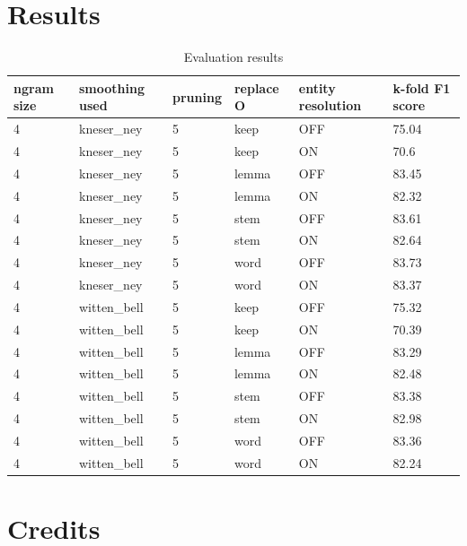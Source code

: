 \documentclass[11pt,a4paper]{article}
\begin{document}
\section{Results}
\begin{table}[]
\centering
\caption{Evaluation results }
\label{tab:eval-results}
\begin{tabular}{llllll}
\hline
\textbf{ngram size} & \textbf{smoothing used} & \textbf{pruning} & \textbf{replace O} & \textbf{entity resolution} & \textbf{k-fold F1 score} \\ \hline
4 & kneser\_ney & 5 & keep & OFF & 75.04 \\
4 & kneser\_ney & 5 & keep & ON & 70.6 \\
4 & kneser\_ney & 5 & lemma & OFF & 83.45 \\
4 & kneser\_ney & 5 & lemma & ON & 82.32 \\
4 & kneser\_ney & 5 & stem & OFF & 83.61 \\
4 & kneser\_ney & 5 & stem & ON & 82.64 \\
4 & kneser\_ney & 5 & word & OFF & 83.73 \\
4 & kneser\_ney & 5 & word & ON & 83.37 \\
4 & witten\_bell & 5 & keep & OFF & 75.32 \\
4 & witten\_bell & 5 & keep & ON & 70.39 \\
4 & witten\_bell & 5 & lemma & OFF & 83.29 \\
4 & witten\_bell & 5 & lemma & ON & 82.48 \\
4 & witten\_bell & 5 & stem & OFF & 83.38 \\
4 & witten\_bell & 5 & stem & ON & 82.98 \\
4 & witten\_bell & 5 & word & OFF & 83.36 \\
4 & witten\_bell & 5 & word & ON & 82.24
\\ \hline
\end{tabular}
\end{table}

\section{Credits}
\end{document}
